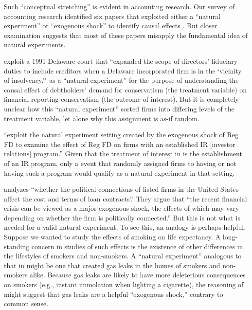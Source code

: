 \documentclass[11pt]{amsart}
\begin{document}
Such ``conceptual stretching'' is evident in accounting research.
Our survey of accounting research identified six papers that exploited either a ``natural experiment'' or ``exogenous shock'' to identify causal effects \citep{Lo:2013jk,Aier:2014ii,Kirk:2014gx,Houston:2014hv}. %
But closer examination suggests that most of these papers misapply the fundamental idea of natural experiments.

\cite{Aier:2014ii} exploit a 1991 Delaware court that ``expanded the scope of directors' fiduciary duties to include creditors when a Delaware incorporated firm is in the `vicinity of insolvency.'" as a ``natural experiment'' for the purpose of understanding the causal effect of debtholders' demand for conservatism (the treatment variable) on financial reporting conservatism (the outcome of interest). But it is completely unclear how this ``natural experiment'' sorted firms into differing levels of the treatment variable, let alone why this assignment is as-if random.

 \citet{Kirk:2014gx} ``exploit the natural experiment setting created by the exogenous shock of Reg FD to examine the effect of Reg FD on firms with an established IR [investor relations] program.'' 
Given that the treatment of interest in \citet{Kirk:2014gx} is the establishment of an IR program, only a event that randomly assigned firms to having or not having such a program would qualify as a natural experiment in that setting.

\cite{Houston:2014hv} analyzes ``whether the political connections of listed firms in the United States affect the cost and terms of loan contracts'.' They argue that ``the recent financial crisis can be viewed as a major exogenous shock, the effects of which may vary depending on whether the firm is politically connected.'' But this is not what is needed for a valid natural experiment. To see this, an analogy is perhaps helpful. Suppose we wanted to study the effects of smoking on life expectancy. A long-standing concern in studies of such effects is the existence of other differences in the lifestyles of smokers and non-smokers. A ``natural experiment'' analogous to that in \cite{Houston:2014hv} might be one that created gas leaks in the homes of smokers and non-smokers alike. Because gas leaks are likely to have more deleterious consequences on smokers (e.g., instant immolation when lighting a cigarette), the reasoning of \cite{Houston:2014hv} might suggest that gas leaks are a helpful ``exogenous shock,'' contrary to common sense.
\end{document}
